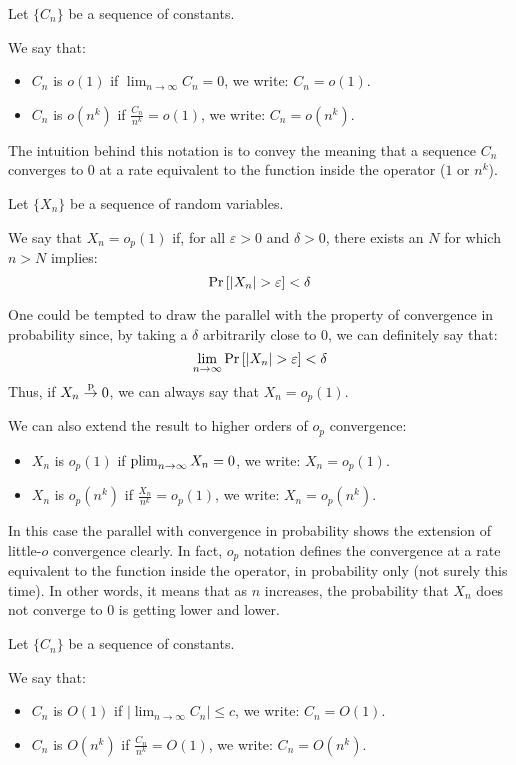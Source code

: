\begin{definition}
Let $\{ C_n\}$ be a sequence of constants. 

We say that: \begin{itemize}
\item $C_n$ is $o(1)$ if $\lim_{n\to\infty} C_n = 0$, we write: $C_n = o(1)$.
\item $C_n$ is $o(n^k)$ if $\frac{C_n}{n^k}=o(1)$, we write: $C_n = o(n^k)$.
\end{itemize}
\end{definition} 

The intuition behind this notation is to convey the meaning that a sequence $C_n$ converges to $0$ at a rate equivalent to the function inside the operator ($1$ or $n^k$).

\begin{definition}
Let $\{X_n\}$ be a sequence of random variables. 

We say that $X_n = o_p(1)$ if, for all $\varepsilon >0$ and $\delta >0$, there exists an $N$ for which $n>N$ implies: $$\operatorname{Pr}\left[\lvert X_n\rvert > \varepsilon\right] < \delta $$

One could be tempted to draw the parallel with the property of convergence in probability since, by taking a $\delta$ arbitrarily close to $0$, we can definitely say that: $$ \lim_{n\to\infty} \operatorname{Pr}\left[\lvert X_n\rvert > \varepsilon\right] < \delta $$ Thus, if $X_n\overset{\text{p}}{\to} 0$, we can always say that $X_n = o_p(1)$. 

We can also extend the result to higher orders of $o_p$ convergence: \begin{itemize}
\item $X_n$ is $o_p(1)$ if $\operatorname{plim}_{n\to\infty} X_n = 0$, we write: $X_n = o_p(1)$.
\item $X_n$ is $o_p(n^k)$ if $\frac{X_n}{n^k}=o_p(1)$, we write: $X_n = o_p(n^k)$.
\end{itemize}
\end{definition}

In this case the parallel with convergence in probability shows the extension of little-$o$ convergence clearly. In fact, $o_p$ notation defines the convergence at a rate equivalent to the function inside the operator, in probability only (not surely this time). In other words, it means that as $n$ increases, the probability that $X_n$ does not converge to 0 is getting lower and lower.

\begin{definition} 
Let $\{ C_n\}$ be a sequence of constants. 

We say that: \begin{itemize}
\item $C_n$ is $O(1)$ if $\lvert\lim_{n\to\infty} C_n\rvert \leq c$, we write: $C_n = O(1)$.
\item $C_n$ is $O(n^k)$ if $\frac{C_n}{n^k} = O(1)$, we write: $C_n = O(n^k)$.
\end{itemize}
\end{definition}

